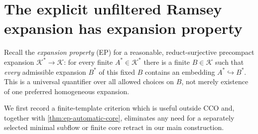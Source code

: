 \section{The explicit unfiltered Ramsey expansion has expansion property}
\label{sec:ep-unfiltered}

Recall the \emph{expansion property} (EP) for a reasonable,
reduct-surjective precompact expansion
\(\mathcal K^*\to\mathcal K\): for every finite
\(A^*\in\mathcal K^*\) there is a finite
\(B\in\mathcal K\) such that \emph{every}
admissible expansion \(B^*\) of this fixed \(B\)
contains an embedding \(A^*\hookrightarrow B^*\).
This is a universal quantifier over all allowed
choices on \(B\), not merely existence of
one preferred homogeneous expansion.

We first record a finite-template criterion which is useful
outside CCO and, together with
\cref{thm:ep-automatic-core}, eliminates any need
for a separately selected minimal subflow or finite core retract
in our main construction.

